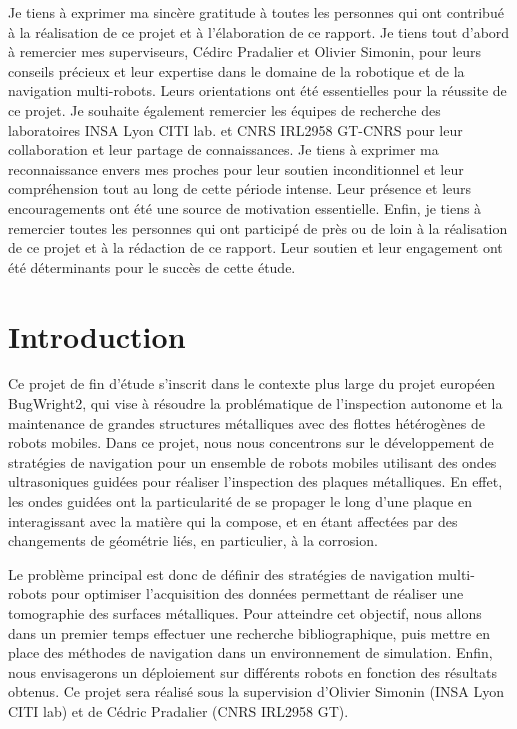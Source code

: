 \documentclass[francais,RandD]{rapportPFE}
\begin{document}
	\begin{remerciements}
		Je tiens à exprimer ma sincère gratitude à toutes les personnes qui ont contribué à la réalisation de ce projet et à l'élaboration de ce rapport.
		Je tiens tout d'abord à remercier mes superviseurs, Cédirc Pradalier et Olivier Simonin, pour leurs conseils précieux et leur expertise dans le domaine de la robotique et de la navigation multi-robots. Leurs orientations ont été essentielles pour la réussite de ce projet.
		Je souhaite également remercier les équipes de recherche des laboratoires INSA Lyon CITI lab. et CNRS IRL2958 GT-CNRS pour leur collaboration et leur partage de connaissances.
		Je tiens à exprimer ma reconnaissance envers mes proches pour leur soutien inconditionnel et leur compréhension tout au long de cette période intense.
		Leur présence et leurs encouragements ont été une source de motivation essentielle.
		Enfin, je tiens à remercier toutes les personnes qui ont participé de près ou de loin à la réalisation de ce projet et à la rédaction de ce rapport.
		Leur soutien et leur engagement ont été déterminants pour le succès de cette étude.
	\end{remerciements}
	\setcounter{tocdepth}{3}
	\listoffigures
	\clearpage
	\listoftables
	\clearpage
	\listofalgorithms
	\clearpage
	\tableofcontents
	\cleardoublepage
	\section{Introduction}
		Ce projet de fin d'étude s'inscrit dans le contexte plus large du projet européen BugWright2, qui vise à résoudre la problématique de l'inspection autonome et la maintenance de grandes structures métalliques avec des flottes hétérogènes de robots mobiles. Dans ce projet, nous nous concentrons sur le développement de stratégies de navigation pour un ensemble de robots mobiles utilisant des ondes ultrasoniques guidées pour réaliser l'inspection des plaques métalliques. En effet, les ondes guidées ont la particularité de se propager le long d'une plaque en interagissant avec la matière qui la compose, et en étant affectées par des changements de géométrie liés, en particulier, à la corrosion.

		Le problème principal est donc de définir des stratégies de navigation multi-robots pour optimiser l'acquisition des données permettant de réaliser une tomographie des surfaces métalliques. Pour atteindre cet objectif, nous allons dans un premier temps effectuer une recherche bibliographique, puis mettre en place des méthodes de navigation dans un environnement de simulation. Enfin, nous envisagerons un déploiement sur différents robots en fonction des résultats obtenus. Ce projet sera réalisé sous la supervision d'Olivier Simonin (INSA Lyon CITI lab) et de Cédric Pradalier (CNRS IRL2958 GT).
\end{document}

